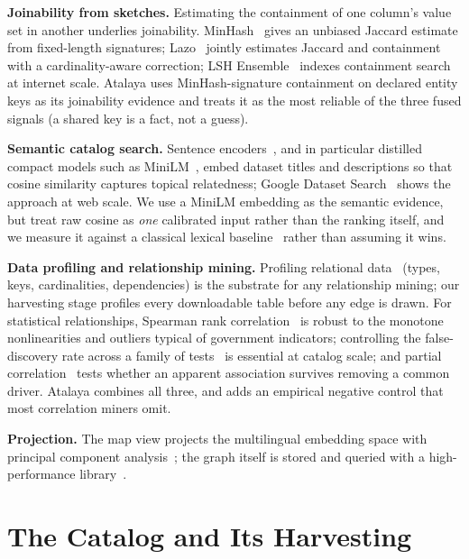 \documentclass[journal]{IEEEtran}
\begin{document}
\textbf{Joinability from sketches.} Estimating the containment of one column's value set in another underlies
joinability. MinHash~\cite{minhash} gives an unbiased Jaccard estimate from fixed-length signatures;
Lazo~\cite{lazo} jointly estimates Jaccard and containment with a cardinality-aware correction; LSH
Ensemble~\cite{lshensemble} indexes containment search at internet scale. Atalaya uses MinHash-signature
containment on declared entity keys as its joinability evidence and treats it as the most reliable of the three
fused signals (a shared key is a fact, not a guess).

\textbf{Semantic catalog search.} Sentence encoders~\cite{sbert}, and in particular distilled compact models such
as MiniLM~\cite{minilm}, embed dataset titles and descriptions so that cosine similarity captures topical
relatedness; Google Dataset Search~\cite{gds} shows the approach at web scale. We use a MiniLM embedding as the
semantic evidence, but treat raw cosine as \emph{one} calibrated input rather than the ranking itself, and we
measure it against a classical lexical baseline~\cite{tfidf} rather than assuming it wins.

\textbf{Data profiling and relationship mining.} Profiling relational data~\cite{profiling} (types, keys,
cardinalities, dependencies) is the substrate for any relationship mining; our harvesting stage profiles every
downloadable table before any edge is drawn. For statistical relationships, Spearman rank
correlation~\cite{spearman} is robust to the monotone nonlinearities and outliers typical of government
indicators; controlling the false-discovery rate across a family of tests~\cite{bh} is essential at catalog
scale; and partial correlation~\cite{partialcorr} tests whether an apparent association survives removing a
common driver. Atalaya combines all three, and adds an empirical negative control that most correlation miners
omit.

\textbf{Projection.} The map view projects the multilingual embedding space with principal component
analysis~\cite{pca}; the graph itself is stored and queried with a high-performance library~\cite{rustworkx}.

\section{The Catalog and Its Harvesting}\label{sec:catalog}
\end{document}
